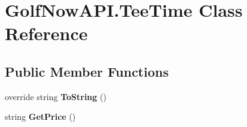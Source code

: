 \hypertarget{class_golf_now_a_p_i_1_1_tee_time}{}\section{Golf\+Now\+A\+P\+I.\+Tee\+Time Class Reference}
\label{class_golf_now_a_p_i_1_1_tee_time}
\subsection*{Public Member Functions}
\begin{DoxyCompactItemize}
\item 
\mbox{\label{class_golf_now_a_p_i_1_1_tee_time_aa8cdc874848b03fcd8c4162fda8f13ed}} 
override string {\bfseries To\+String} ()
\item 
\mbox{\label{class_golf_now_a_p_i_1_1_tee_time_aaee191b69befb50f0a13e13b0477ecbe}} 
string {\bfseries Get\+Price} ()
\end{DoxyCompactItemize}
